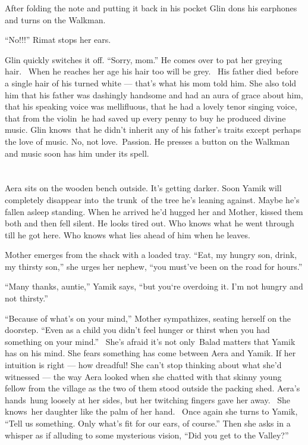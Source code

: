 \documentclass[twoside,11pt,openany]{book}
\begin{document}
{After folding the
}note{ }{and putting it back
in his pocket Glin dons his earphones and turns on the Walkman. }

``No!!!'' Rimat stops her ears.

Glin quickly
switches {it off. ``Sorry, mom.'' }He comes over to pat her greying
hair.~ When he reaches her age his hair too will be grey.~ His father died~before a single hair of his turned white ---
that's what his mom told him.  She also told him that{ }his father was dashingly handsome and had an
aura of grace about him, that his speaking voice was mellifluous, that he had a lovely tenor singing voice, that from
the violin~he had saved up every penny to buy he produced divine music. Glin knows~that
{he didn't inherit any of his father's traits except perhaps the
love of music. No, not love.~Passion. He }presses {a button on the
Walkman and }music soon has him under its spell.

\chapter{}

{Aera sits on the wooden bench
out}side{. }It's getting darker.
Soon{ Yamik will completely disappear into~the trunk~of the tree he's
leaning against. Maybe he's fallen asleep standing. When he }arrived he'd hugged her and Mother, kissed them both
and then fell silent. He looks tired out. Who knows what he went through till he got here. Who knows what lies ahead of
him when he leaves.

Mother emerges from the shack with a loaded tray. {{}``Eat, my hungry
son, drink, my thirsty son,'' she urges her
}{nephew}{, ``you must've been on the road for
hours.''}

{{}``Many thanks, auntie,'' Yamik says,
``but you`re overdoing it. I'm not hungry }and
not {thirsty.''}

``Because of what's on your mind,'' Mother sympathizes, seating herself on the doorstep. ``Even as a child you
didn't feel hunger or thirst when you had something on your mind.''~ She's afraid it's not only~Balad matters that
Yamik has on his mind. She fears something has come between Aera and Yamik. If her intuition is right --- how dreadful!
She can't stop thinking about what she'd witnessed --- the way Aera looked when she chatted with that
skinny{ }young fellow from the village as the two of them stood outside the packing shed. Aera's
hands~hung loosely at her sides, but her twitching fingers gave her away.~ She knows~her daughter like the palm of her
hand.~ Once again she turns to Yamik, ``Tell us something. Only what's fit for our ears, of course.{}'' Then she asks
in a whisper as if alluding to some mysterious vision, ``Did you get to the Valley?''
\end{document}
